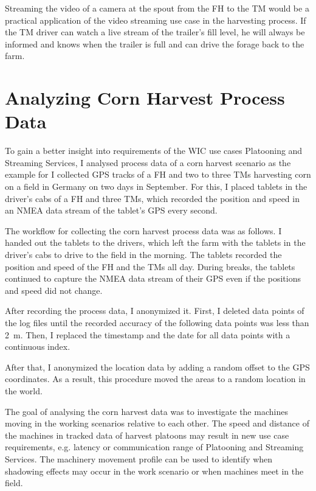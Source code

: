 Streaming the video of a camera at the spout from the \ac{FH} to the \ac{TM} would be a practical application of the video streaming use case in the harvesting process. If the \ac{TM} driver can watch a live stream of the trailer's fill level, he will always be
informed and knows when the trailer is full and can drive the forage back to the
farm.

\chapter{Analyzing Corn Harvest Process Data}

To gain a better insight into requirements of the \ac{WIC} use cases Platooning and Streaming Services, I analysed process data of a corn harvest scenario as the example for I collected GPS tracks of  a  \ac{FH} and two to three \ac{TM}s harvesting corn on a field in Germany on two days in September. For this, I placed tablets in the driver's cabs of  a  \ac{FH} and three \ac{TM}s, which recorded the position and speed in an NMEA data stream of the tablet's GPS every second. 

The workflow for collecting the corn harvest process data was as follows. 
I handed out the tablets to the drivers, which left the farm with the tablets in the driver's cabs to drive to the field in the morning. The tablets recorded the position and speed of the \ac{FH} and the \ac{TM}s all day. During breaks, the tablets continued to capture the NMEA data stream of their GPS even if the positions and speed did not change.

After recording the process data, I anonymized it. 
First, I deleted data points of the log files until the recorded accuracy of the following data points was less than \SI{2}{\metre}. Then, I replaced the timestamp and the date for all data points with a continuous index.

After that, I anonymized the location data by adding a random offset to the GPS coordinates. As a result, this procedure moved the areas to a random location in the world.

The goal of analysing the corn harvest data was to investigate the machines moving in the working scenarios relative to each other. The speed and distance of the machines in tracked data of harvest platoons may result in new use case requirements, e.g. latency or communication range of Platooning and Streaming Services. The machinery movement profile can be used to identify when shadowing effects may occur in the work scenario or when machines meet in the field.

